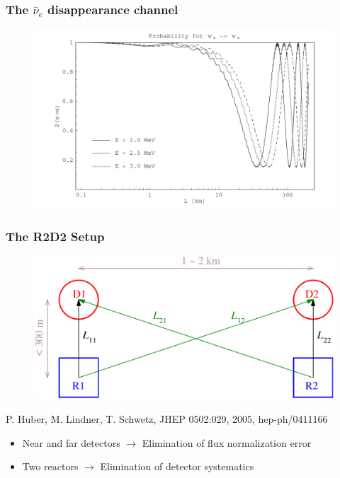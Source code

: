 \documentclass{beamer}
\newcommand{\reference}[1]{\tiny #1 \normalsize}
\begin{document}
\begin{frame}
  \frametitle{The $\bar{\nu}_e$ disappearance channel}

  \begin{figure}
    \includegraphics[width=12 cm]{fig/P_ee.pdf}
  \end{figure}
\end{frame}

\begin{frame}
  \frametitle{The R2D2 Setup}

  \begin{figure}
    \includegraphics[width=11 cm]{fig/R2D2_geometry.pdf}
  \end{figure}
  \begin{flushright}
    \reference{P. Huber, M. Lindner, T. Schwetz, JHEP 0502:029, 2005, hep-ph/0411166}
  \end{flushright}
  \begin{itemize}
    \item Near and far detectors $\longrightarrow$ Elimination of flux normalization error
    \item Two reactors $\longrightarrow$ Elimination of detector systematics
  \end{itemize}
\end{frame}
\end{document}

